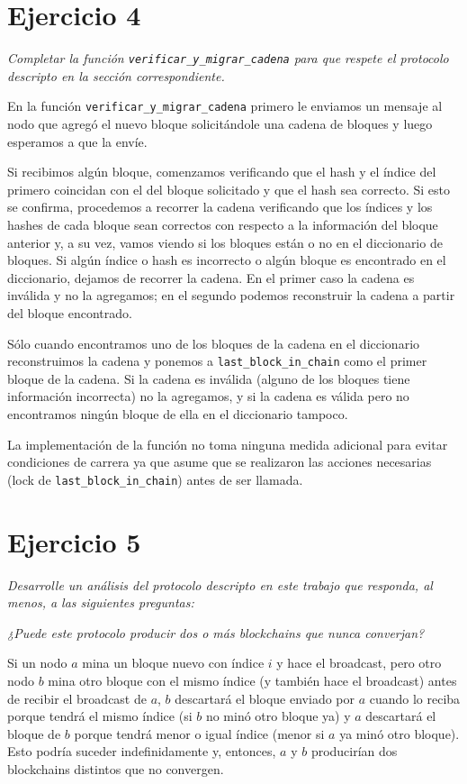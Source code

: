 \section{Ejercicio 4}

\emph{Completar la función \texttt{verificar\_y\_migrar\_cadena} para que respete el protocolo descripto en la sección correspondiente.}

En la función \texttt{verificar\_y\_migrar\_cadena} primero le enviamos un mensaje al nodo que agregó el nuevo bloque solicitándole una cadena de bloques y luego esperamos a que la envíe.

Si recibimos algún bloque, comenzamos verificando que el hash y el índice del primero coincidan con el del bloque solicitado y que el hash sea correcto. Si esto se confirma, procedemos a recorrer la cadena verificando que los índices y los hashes de cada bloque sean correctos con respecto a la información del bloque anterior y, a su vez, vamos viendo si los bloques están o no en el diccionario de bloques. Si algún índice o hash es incorrecto o algún bloque es encontrado en el diccionario, dejamos de recorrer la cadena. En el primer caso la cadena es inválida y no la agregamos; en el segundo podemos reconstruir la cadena a partir del bloque encontrado.

Sólo cuando encontramos uno de los bloques de la cadena en el diccionario  reconstruimos la cadena y ponemos a \texttt{last\_block\_in\_chain} como el primer bloque de la cadena. Si la cadena es inválida (alguno de los bloques tiene información incorrecta) no la agregamos, y si la cadena es válida pero no encontramos ningún bloque de ella en el diccionario tampoco.

La implementación de la función no toma ninguna medida adicional para evitar condiciones de carrera ya que asume que se realizaron las acciones necesarias (lock de \texttt{last\_block\_in\_chain}) antes de ser llamada.


\section{Ejercicio 5}

\emph{Desarrolle un análisis del protocolo descripto en este trabajo que responda, al menos, a las siguientes preguntas:}

\emph{¿Puede este protocolo producir dos o más blockchains que nunca converjan?}

Si un nodo $a$ mina un bloque nuevo con índice $i$ y hace el broadcast, pero otro nodo $b$ mina otro bloque con el mismo índice (y también hace el broadcast) antes de recibir el broadcast de $a$, $b$ descartará el bloque enviado por $a$ cuando lo reciba porque tendrá el mismo índice (si $b$ no minó otro bloque ya) y $a$ descartará el bloque de $b$ porque tendrá menor o igual índice (menor si $a$ ya minó otro bloque). Esto podría suceder indefinidamente y, entonces, $a$ y $b$ producirían dos blockchains distintos que no convergen.


